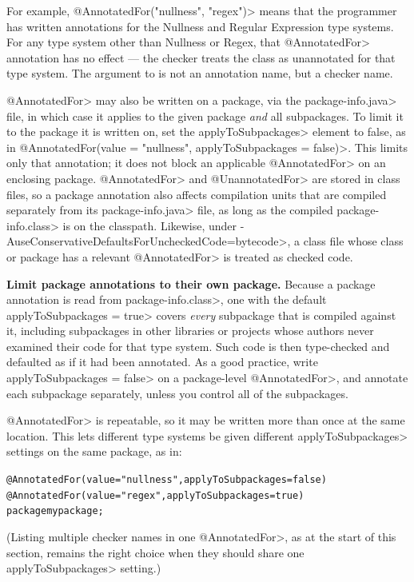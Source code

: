 For example, \<@AnnotatedFor(\ttlcb"nullness", "regex"\ttrcb)> means that
the programmer has written annotations for the Nullness and Regular
Expression type systems.
For any type system other than Nullness or Regex, that \<@AnnotatedFor>
annotation has no effect --- the checker treats the class as
unannotated for that type system.
The argument to  is not an
annotation name, but a checker name.

\<@AnnotatedFor> may also be written on a package, via the
\<package-info.java> file, in which case it applies to the given package
\emph{and} all subpackages.  To limit it to the package it is written on,
set the \<applyToSubpackages> element to false, as in
\<@AnnotatedFor(value = "nullness", applyToSubpackages = false)>.
This limits only that annotation; it does not block an applicable
\<@AnnotatedFor> on an enclosing package.
\<@AnnotatedFor> and \<@UnannotatedFor> are stored in class files, so a
package annotation also affects compilation units that are compiled
separately from its \<package-info.java> file, as long as the compiled
\<package-info.class> is on the classpath.  Likewise, under
\<-AuseConservativeDefaultsForUncheckedCode=bytecode>, a class file whose
class or package has a relevant \<@AnnotatedFor> is treated as checked code.

\textbf{Limit package annotations to their own package.}  Because a package
annotation is read from \<package-info.class>, one with the default
\<applyToSubpackages = true> covers \emph{every} subpackage that is
compiled against it, including subpackages in other libraries or projects
whose authors never examined their code for that type system.  Such code is
then type-checked and defaulted as if it had been annotated.  As a good
practice, write \<applyToSubpackages = false> on a package-level
\<@AnnotatedFor>, and annotate each subpackage separately, unless you
control all of the subpackages.

\<@AnnotatedFor> is repeatable, so it may be written more than once at the
same location.  This lets different type systems be given different
\<applyToSubpackages> settings on the same package, as in:
\begin{alltt}
  @AnnotatedFor(value = "nullness", applyToSubpackages = false)
  @AnnotatedFor(value = "regex", applyToSubpackages = true)
  package mypackage;
\end{alltt}
(Listing multiple checker names in one \<@AnnotatedFor>, as at the start of
this section, remains the right choice when they should share one
\<applyToSubpackages> setting.)

